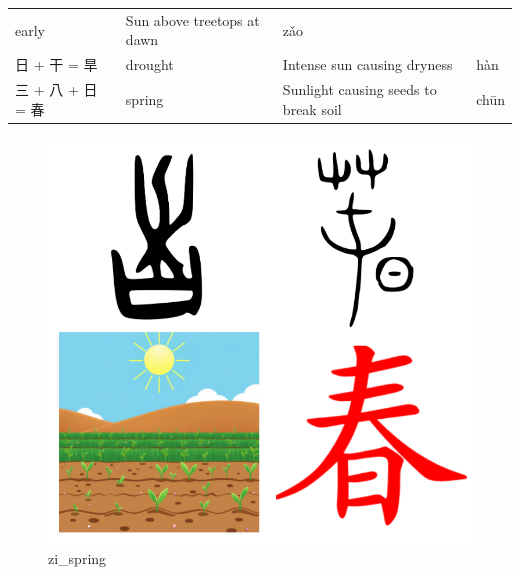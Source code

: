 \begin{longtable}[]{@{}llll@{}}
\begin{minipage}[t]{0.19\columnwidth}
early\strut
\end{minipage} & \begin{minipage}[t]{0.33\columnwidth}\raggedright
Sun above treetops at dawn\strut
\end{minipage} & \begin{minipage}[t]{0.19\columnwidth}\raggedright
zǎo\strut
\end{minipage}\tabularnewline
\begin{minipage}[t]{0.19\columnwidth}\raggedright
日 + 干 = 旱\strut
\end{minipage} & \begin{minipage}[t]{0.19\columnwidth}\raggedright
drought\strut
\end{minipage} & \begin{minipage}[t]{0.33\columnwidth}\raggedright
Intense sun causing dryness\strut
\end{minipage} & \begin{minipage}[t]{0.19\columnwidth}\raggedright
hàn\strut
\end{minipage}\tabularnewline
\begin{minipage}[t]{0.19\columnwidth}\raggedright
三 + 八 + 日 = 春\strut
\end{minipage} & \begin{minipage}[t]{0.19\columnwidth}\raggedright
spring\strut
\end{minipage} & \begin{minipage}[t]{0.33\columnwidth}\raggedright
Sunlight causing seeds to break soil\strut
\end{minipage} & \begin{minipage}[t]{0.19\columnwidth}\raggedright
chūn\strut
\end{minipage}\tabularnewline
\bottomrule
\end{longtable}

\begin{figure}
\centering
\includegraphics{./images/zi_spring.png}
\caption{zi\_spring}
\end{figure}

